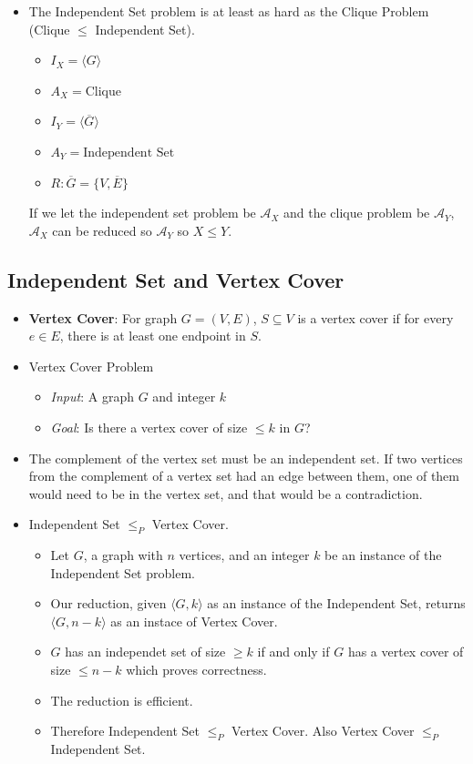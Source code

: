 \begin{itemize}
    \item The Independent Set problem is at least as hard as the Clique Problem (Clique $\leq$ Independent Set).
    \begin{itemize}
        \item $I_X = \langle G \rangle$
        \item $A_X = \text{Clique}$
        \item $I_Y = \langle \overline{G} \rangle$
        \item $A_Y = \text{Independent Set}$
        \item $R: \overline{G} = \{ V, \overline{E} \}$
    \end{itemize}
    If we let the independent set problem be $\mathcal{A}_X$ and the clique problem be $\mathcal{A}_Y$, $\mathcal{A}_X$ can be reduced so $\mathcal{A}_Y$ so $X \leq Y$.
\end{itemize}

\subsection{Independent Set and Vertex Cover}
\begin{itemize}
    \item \textbf{Vertex Cover}: For graph $G = (V, E)$, $S \subseteq V$ is a vertex cover if for every $e \in E$, there is at least one endpoint in $S$.
    \item Vertex Cover Problem
    \begin{itemize}
        \item \textit{Input}: A graph $G$ and integer $k$
        \item \textit{Goal}: Is there a vertex cover of size $\leq k$ in $G$?
    \end{itemize}
    \item The complement of the vertex set must be an independent set. If two vertices from the complement of a vertex set had an edge between them, one of them would need to be in the vertex set, and that would be a contradiction.
    \item Independent Set $\leq_P$ Vertex Cover.
    \begin{itemize}
        \item Let $G$, a graph with $n$ vertices, and an integer $k$ be an instance of the Independent Set problem.
        \item Our reduction, given $\langle G, k \rangle$ as an instance of the Independent Set, returns $\langle G, n - k \rangle$ as an instace of Vertex Cover. 
        \item $G$ has an independet set of size $\geq k$ if and only if $G$ has a vertex cover of size $\leq n - k$ which proves correctness.
        \item The reduction is efficient.
        \item Therefore Independent Set $\leq_P$ Vertex Cover. Also Vertex Cover $\leq_P$ Independent Set.
    \end{itemize}
\end{itemize}

